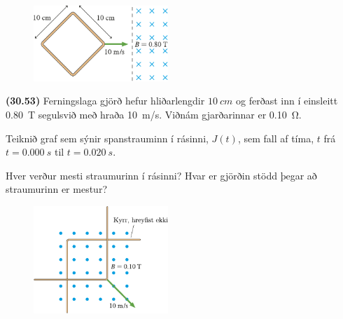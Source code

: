 \ifdefined \wholebook \else\documentclass[oneside]{book}\usepackage{EdlBook}\graphicspath{{figures/}}
\begin{document}
\begin{enumerate}[label = \textbf{(\alph*)}]

\begin{minipage}{\linewidth}
\begin{figure}
\vspace{-0.75cm}
\includegraphics[width = 2in]{figures/rk3053b.pdf}
\end{figure}

\item[\textbf{(30.53)}] Ferningslaga gjörð hefur hliðarlengdir $ \SI{10}{cm}$ og ferðast inn í einsleitt \SI{0.80}{T} segulsvið með hraða \SI{10}{m/s}. Viðnám gjarðarinnar er \SI{0.10}{\ohm}. \begin{enumerate*}[label = \textbf{(\alph*)}]
    \item Teiknið graf sem sýnir spanstrauminn í rásinni, $J(t)$, sem fall af tíma, $t$ frá $t = \SI{0.000}{s}$ til $t = \SI{0.020}{s}$.
    \item Hver verður mesti straumurinn í rásinni? Hvar er gjörðin stödd þegar að straumurinn er mestur?
\end{enumerate*}

\end{minipage}

\vspace{0.3cm}

\begin{minipage}{\linewidth}
\begin{figure}
\vspace{-0.25cm}
\includegraphics[width = 2in]{figures/rk3054.pdf}
\end{figure}


\end{minipage}
\end{enumerate}
\end{document}
